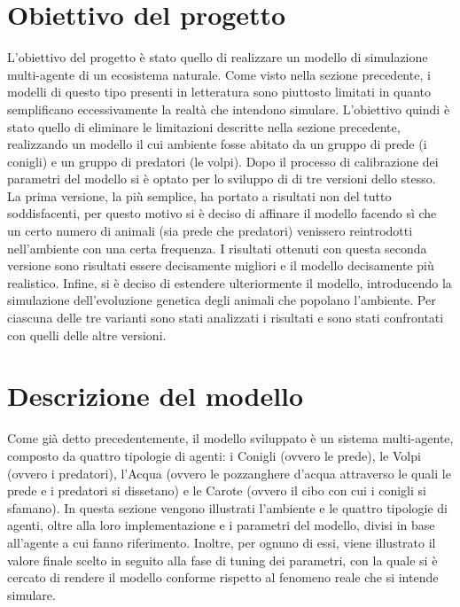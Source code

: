 \documentclass[11pt]{article}
\begin{document}
\section{Obiettivo del progetto}
L'obiettivo del progetto è stato quello di realizzare un modello di simulazione multi-agente di un ecosistema naturale. Come visto nella sezione precedente, i modelli di questo tipo presenti in letteratura sono piuttosto limitati in quanto semplificano eccessivamente la realtà che intendono simulare. L'obiettivo quindi è stato quello di eliminare le limitazioni descritte nella sezione precedente, realizzando un modello il cui ambiente fosse abitato da un gruppo di prede (i conigli) e un gruppo di predatori (le volpi). Dopo il processo di calibrazione dei parametri del modello si è optato per lo sviluppo di di tre versioni dello stesso. La prima versione, la più semplice, ha portato a risultati non del tutto soddisfacenti, per questo motivo si è deciso di affinare il modello facendo sì che un certo numero di animali (sia prede che predatori) venissero reintrodotti nell'ambiente con una certa frequenza. I risultati ottenuti con questa seconda versione sono risultati essere decisamente migliori e il modello decisamente più realistico. Infine, si è deciso di estendere ulteriormente il modello, introducendo la simulazione dell'evoluzione genetica degli animali che popolano l'ambiente. Per ciascuna delle tre varianti sono stati analizzati i risultati e sono stati confrontati con quelli delle altre versioni. 

\section{Descrizione del modello}
Come già detto precedentemente, il modello sviluppato è un sistema multi-agente, composto da quattro tipologie di agenti: i Conigli (ovvero le prede), le Volpi (ovvero i predatori), l'Acqua (ovvero le pozzanghere d'acqua attraverso le quali le prede e i predatori si dissetano) e le Carote (ovvero il cibo con cui i conigli si sfamano). In questa sezione vengono illustrati l'ambiente e le quattro tipologie di agenti, oltre alla loro implementazione e i parametri del modello, divisi in base all'agente a cui fanno riferimento. Inoltre, per ognuno di essi, viene illustrato il valore finale scelto in seguito alla fase di tuning dei parametri, con la quale si è cercato di rendere il modello conforme rispetto al fenomeno reale che si intende simulare. 
\end{document}
